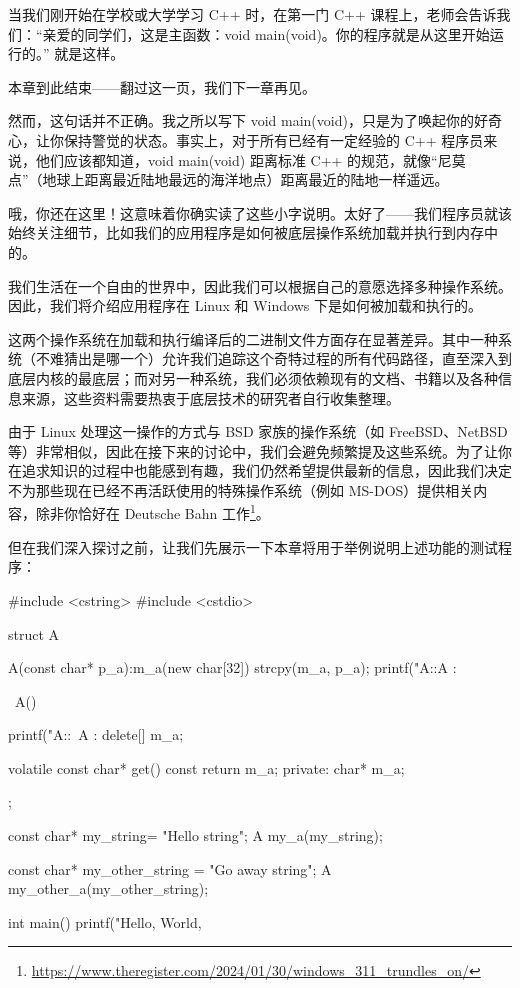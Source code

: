 
当我们刚开始在学校或大学学习 C++ 时，在第一门 C++ 课程上，老师会告诉我们：“亲爱的同学们，这是主函数：void main(void)。你的程序就是从这里开始运行的。” 就是这样。

本章到此结束——翻过这一页，我们下一章再见。

然而，这句话并不正确。我之所以写下 void main(void)，只是为了唤起你的好奇心，让你保持警觉的状态。事实上，对于所有已经有一定经验的 C++ 程序员来说，他们应该都知道，void main(void) 距离标准 C++ 的规范，就像“尼莫点”（地球上距离最近陆地最远的海洋地点）距离最近的陆地一样遥远。

哦，你还在这里！这意味着你确实读了这些小字说明。太好了——我们程序员就该始终关注细节，比如我们的应用程序是如何被底层操作系统加载并执行到内存中的。

我们生活在一个自由的世界中，因此我们可以根据自己的意愿选择多种操作系统。因此，我们将介绍应用程序在 Linux 和 Windows 下是如何被加载和执行的。

这两个操作系统在加载和执行编译后的二进制文件方面存在显著差异。其中一种系统（不难猜出是哪一个）允许我们追踪这个奇特过程的所有代码路径，直至深入到底层内核的最底层；而对另一种系统，我们必须依赖现有的文档、书籍以及各种信息来源，这些资料需要热衷于底层技术的研究者自行收集整理。

由于 Linux 处理这一操作的方式与 BSD 家族的操作系统（如 FreeBSD、NetBSD 等）非常相似，因此在接下来的讨论中，我们会避免频繁提及这些系统。为了让你在追求知识的过程中也能感到有趣，我们仍然希望提供最新的信息，因此我们决定不为那些现在已经不再活跃使用的特殊操作系统（例如 MS-DOS）提供相关内容，除非你恰好在 Deutsche Bahn 工作\footnote{\url{https://www.theregister.com/2024/01/30/windows_311_trundles_on/}}。

但在我们深入探讨之前，让我们先展示一下本章将用于举例说明上述功能的测试程序：

\begin{cpp}
#include <cstring>
#include <cstdio>

struct A {
  A(const char* p_a):m_a(new char[32]) { strcpy(m_a, p_a);
    printf("A::A : %
  }

  ~A() {

  printf("A::~A : %
    delete[] m_a;
  }

  volatile const char* get() const {return m_a;}
private:
  char* m_a;
};

const char* my_string= "Hello string";
A my_a(my_string);

const char* my_other_string = "Go away string";
A my_other_a(my_other_string);

int main() {
  printf("Hello, World, %
}
\end{cpp}

